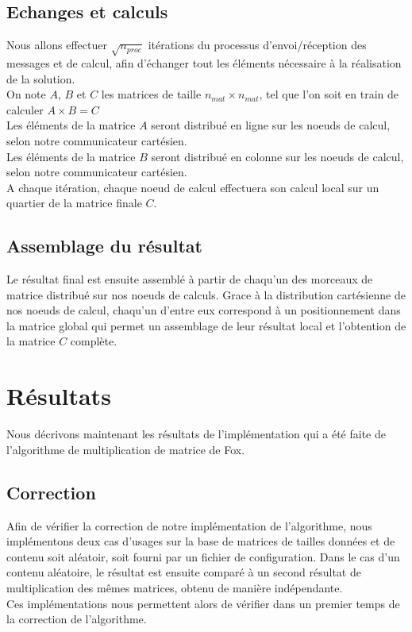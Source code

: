 \documentclass{article}
\begin{document}
\subsection{Echanges et calculs}
Nous allons effectuer $\sqrt{n_{proc}}$ itérations du processus d'envoi/réception des messages et de calcul, afin d'échanger tout les éléments nécessaire à la réalisation de la solution.\\
On note $A$, $B$ et $C$ les matrices de taille $n_{mat} \times n_{mat}$, tel que l'on soit en train de calculer $A \times B = C$\\
Les éléments de la matrice $A$ seront distribué en ligne sur les noeuds de calcul, selon notre communicateur cartésien.\\
Les éléments de la matrice $B$ seront distribué en colonne sur les noeuds de calcul, selon notre communicateur cartésien.\\
A chaque itération, chaque noeud de calcul effectuera son calcul local sur un quartier de la matrice finale $C$.\\
\subsection{Assemblage du résultat}
Le résultat final est ensuite assemblé à partir de chaqu'un des morceaux de matrice distribué sur nos noeuds de calculs. Grace à la distribution cartésienne de nos noeuds de calcul, chaqu'un d'entre eux correspond à un positionnement dans la matrice global qui permet un assemblage de leur résultat local et l'obtention de la matrice $C$ complète.

\section{Résultats}
Nous décrivons maintenant les résultats de l'implémentation qui a été faite de l'algorithme de multiplication de matrice de Fox.

\subsection{Correction}
Afin de vérifier la correction de notre implémentation de l'algorithme, nous implémentons deux cas d'usages sur la base de matrices de tailles données et de contenu soit aléatoir, soit fourni par un fichier de configuration. Dans le cas d'un contenu aléatoire, le résultat est ensuite comparé à un second résultat de multiplication des mêmes matrices, obtenu de manière indépendante.\\
Ces implémentations nous permettent alors de vérifier dans un premier temps de la correction de l'algorithme.
\end{document}
